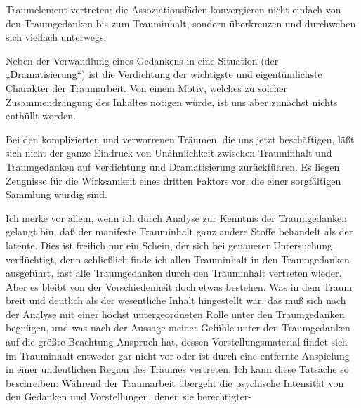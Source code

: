 \documentclass[twoside=true,titlepage=false,open=any, parskip=never, fontsize=10pt, headings=small, chapterprefix=false, appendixprefix=false]{scrbook}
\begin{document}
        \pstart
        Traumelement vertreten; die
               Assoziationsfäden konvergieren nicht einfach von den Traumgedanken
               bis zum Trauminhalt, sondern überkreuzen und durchweben sich
               vielfach unterwegs.
        \pend
    
            
        \pstart
        Neben der Verwandlung eines Gedankens in eine Situation (der „Dramatisierung“)
               ist die Verdichtung der wichtigste und eigentümlichste Charakter der
               Traumarbeit. Von einem Motiv, welches zu solcher Zusammendrängung des Inhaltes
               nötigen würde, ist uns aber zunächst nichts enthüllt worden.
        \pend
    
         
            
            
            \pstart{}\pend
            
        \pstart
        Bei den komplizierten und verworrenen Träumen, die uns jetzt beschäftigen, läßt
               sich nicht der ganze Eindruck von Unähnlichkeit zwischen Trauminhalt und
               Traumgedanken auf Verdichtung und Dramatisierung zurückführen. Es liegen Zeugnisse für die Wirksamkeit eines dritten Faktors vor, die einer
               sorgfältigen Sammlung würdig sind.
        \pend
    
            
        \pstart
        Ich merke vor allem, wenn ich durch Analyse zur Kenntnis der Traumgedanken
               gelangt bin, daß der manifeste Trauminhalt ganz andere Stoffe behandelt als der
               latente. Dies ist freilich nur ein Schein, der sich bei genauerer Untersuchung
               verflüchtigt, denn schließlich finde ich allen Trauminhalt in den Traumgedanken ausgeführt, fast alle Traumgedanken durch den Trauminhalt vertreten wieder. Aber es bleibt von der Verschiedenheit
               doch etwas bestehen. Was in dem Traum breit und deutlich als der wesentliche
               Inhalt hingestellt war, das muß sich nach der Analyse mit einer höchst
               untergeordneten Rolle unter den Traumgedanken begnügen, und was nach
               der Aussage meiner Gefühle unter den Traumgedanken auf die größte Beachtung
               Anspruch hat, dessen Vorstellungsmaterial findet sich im Trauminhalt entweder gar nicht vor oder ist durch eine entfernte Anspielung in
               einer undeutlichen Region des Traumes vertreten. Ich kann diese Tatsache so
                  beschreiben: Während der Traumarbeit übergeht die
                  psychische Intensität von den Gedanken und Vorstellungen, denen sie
                  berechtigter-
        \pend
    
\end{document}
